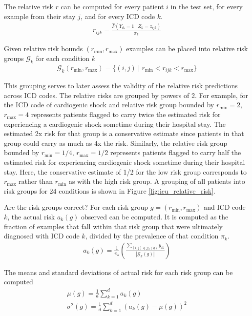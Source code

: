 The relative risk $r$ can be computed for every patient $i$ in the test set, for every example from their stay $j$, and for every ICD code $k$.
\begin{gather}
    r_{ijk} = \frac
        {\hat{P}(Y_{ik} = 1 \mid Z_k = z_{ijk})}
        {\pi_k}
\end{gather}

Given relative risk bounds $(r_{\min}, r_{\max})$ examples can be placed into relative risk groups $\mathcal{G}_k$ for each condition $k$
\begin{gather}
    \mathcal{G}_k(r_{\min}, r_{\max}) = \{ (i, j) \mid r_{\min} < r_{ijk} < r_{\max} \}
\end{gather}

This grouping serves to later assess the validity of the relative risk predictions across ICD codes.  The relative risks are grouped by powers of 2.  For example, for the ICD code of cardiogenic shock and relative risk group bounded by $r_{\min} = 2$, $r_{\max} = 4$ represents patients flagged to carry twice the estimated risk for experiencing a cardiogenic shock sometime during their hospital stay.  The estimated 2x risk for that group is a conservative estimate since patients in that group could carry as much as 4x the risk.  Similarly, the relative risk group bounded by $r_{\min} = 1/4$, $r_{\max} = 1/2$ represents patients flagged to carry half the estimated risk for experiencing cardiogenic shock sometime during their hospital stay.  Here, the conservative estimate of 1/2 for the low risk group corresponds to $r_{\max}$ rather than $r_{\min}$ as with the high risk group.  A grouping of all patients into risk groups for 24 conditions is shown in Figure \ref{fig:icu_relative_risk}.

Are the risk groups correct?  For each risk group $g = (r_{\min}, r_{\max})$ and ICD code $k$, the actual risk $a_k(g)$ observed can be computed.  It is computed as the fraction of examples that fall within that risk group that were ultimately diagnosed with ICD code $k$, divided by the prevalence of that condition $\pi_k$.
\begin{gather}
    a_k(g) = \frac{1}{\pi_k} \left( 
        \frac{\sum_{(i, j) \in \mathcal{G}_k(g)} y_{ik}}{|\mathcal{G}_k(g)|}
    \right)
\end{gather}

The means and standard deviations of actual risk for each risk group can be computed
\begin{gather}
    \mu(g) = \frac{1}{d} \sum_{k=1}^d a_k(g) \\
    \sigma^2(g) = \frac{1}{d} \sum_{k=1}^d (a_k(g) - \mu(g))^2
\end{gather}

